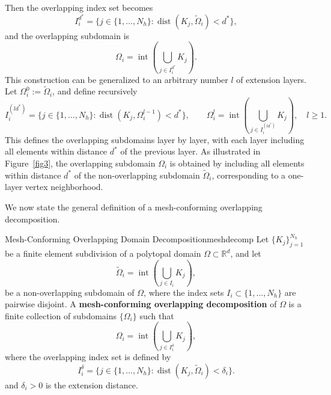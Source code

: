 \begin{enumerate}[label=(\arabic*)]
\noindent Then the overlapping index set becomes  
\begin{equation*}
    I_i^{d^{*}} = \{ j \in \{1, \ldots, N_h\} : \operatorname{dist}(K_j, \widetilde{\Omega}_i) < d^{*}\},
\end{equation*}  
and the overlapping subdomain is  
\begin{equation*}
    \Omega_i = \operatorname{int} \left(\bigcup_{j \in I_i^{d^{*}}} K_j\right).
\end{equation*}  
This construction can be generalized to an arbitrary number $l$ of extension layers. Let $\Omega_i^0 := \widetilde{\Omega}_i$, and define recursively  
\begin{equation*}
    I_i^{(ld^{*})} = \{ j \in \{1, \ldots, N_h\} : \operatorname{dist}(K_j, \Omega_i^{l-1}) < d^{*}\}, \qquad \Omega_i^l = \operatorname{int} \left(\bigcup_{j \in I_i^{(ld^{*})}} K_j \right), \quad l \geq 1.
\end{equation*}  
This defines the overlapping subdomains layer by layer, with each layer including all elements within distance $d^{*}$ of the previous layer.
%     
As illustrated in Figure~\ref{fig3}, the overlapping subdomain $\Omega_i$ is obtained by including all elements within distance $d^{*}$ of the non-overlapping subdomain $\widetilde{\Omega}_i$, corresponding to a one-layer vertex neighborhood.
\end{enumerate}
We now state the general definition of a mesh-conforming overlapping decomposition.
\begin{definition}{Mesh-Conforming Overlapping Domain Decomposition}{meshdecomp}
    Let $\{K_j\}_{j=1}^{N_{h}}$ be a finite element subdivision of a polytopal domain $\Omega\subset \mathbb{R}^{d}$, and let
    \begin{equation*}
        \widetilde{\Omega}_{i} = \operatorname{int}\left(\bigcup_{j \in I_i} K_j \right),
    \end{equation*}
    be a non-overlapping subdomain of $\Omega$, where the index sets $I_i \subset \{1, \ldots, N_h\}$ are pairwise disjoint. A \textbf{mesh-conforming overlapping decomposition} of $\Omega$ is a finite collection of subdomains $\{\Omega_i\}$ such that
    \begin{equation*}
        \Omega_i = \operatorname{int} \left(\bigcup_{j \in I_i^\delta} K_j \right),
    \end{equation*}
    where the overlapping index set is defined by  
    \begin{equation*}
        I_{i}^{\delta} = \{j \in \{1, \ldots, N_h\} : \operatorname{dist}(K_{j}, \widetilde{\Omega}_{i}) < \delta_{i}\}.
    \end{equation*}
    and $\delta_{i} > 0$ is the extension distance.
\end{definition}
